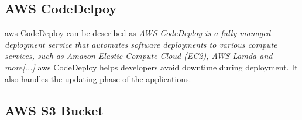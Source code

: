 \subsection{AWS CodeDelpoy}
\acrshort{aws} CodeDeploy can be described as \textit{AWS CodeDeploy is a fully managed deployment service that automates software deployments to various compute services, such as Amazon Elastic Compute Cloud (EC2), AWS Lamda and more[...]}\cite{AWSCodeDeploy}
\acrshort{aws} CodeDeploy helps developers avoid downtime during deployment. It also handles the updating phase of the applications. 

\subsection{AWS S3 Bucket}


